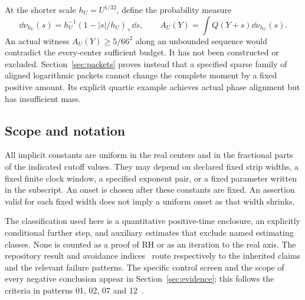 At the shorter scale $h_U=U^{1/32}$, define the probability measure
\[
 \dd\nu_{h_U}(s)=h_U^{-1}(1-|s|/h_U)_+\dd s,
 \qquad A_U(Y)=\int Q(Y+s)\dd\nu_{h_U}(s).
\]
An actual witness $A_U(Y)\ge5/66^2$ along an unbounded sequence
would contradict the every-center sufficient budget. It has not been
constructed or excluded. Section~\ref{sec:packets} proves instead that
a specified sparse family of aligned logarithmic packets cannot change
the complete moment by a fixed positive amount. Its explicit quartic
example achieves actual phase alignment but has insufficient mass.

\subsection{Scope and notation}

All implicit constants are uniform in the real centers and in the
fractional parts of the indicated cutoff values. They may depend on
declared fixed strip widths, a fixed finite clock window, a specified
exponent pair, or a fixed parameter written in the subscript.
An onset is chosen after these constants are fixed. An assertion valid
for each fixed width does not imply a uniform onset as that width shrinks.

The classification used here is a quantitative positive-time enclosure,
an explicitly conditional further step, and auxiliary estimates that
exclude named estimating classes. None is counted as a proof of RH or
as an iteration to the real axis. The repository result and avoidance
indices~\cite{RepoResults,RepoAvoid} route respectively to the inherited
claims and the relevant failure patterns. The specific control screen
and the scope of every negative conclusion appear in
Section~\ref{sec:evidence}; this follows the criteria in patterns
01, 02, 07 and 12~\cite{RepoAvoidPatterns}.
